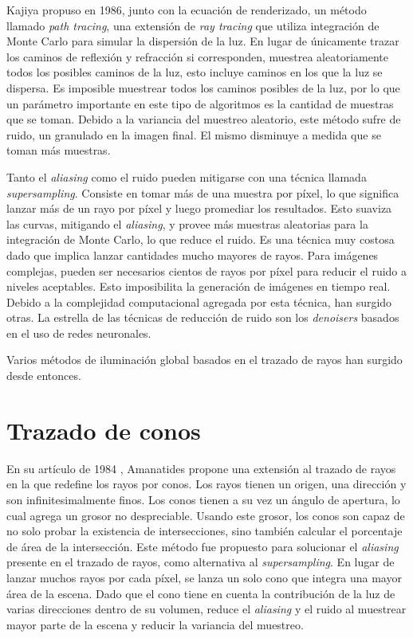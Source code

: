 Kajiya propuso en 1986\cite{rendering-equation}, junto con la ecuación de renderizado, un método llamado \textit{path tracing}, una extensión de \textit{ray tracing} que utiliza integración de Monte Carlo para simular la dispersión de la luz.
En lugar de únicamente trazar los caminos de reflexión y refracción si corresponden, muestrea aleatoriamente todos los posibles caminos de la luz, esto incluye caminos en los que la luz se dispersa.
Es imposible muestrear todos los caminos posibles de la luz, por lo que un parámetro importante en este tipo de algoritmos es la cantidad de muestras que se toman.
Debido a la variancia del muestreo aleatorio, este método sufre de ruido, un granulado en la imagen final.
El mismo disminuye a medida que se toman más muestras.


Tanto el \textit{aliasing} como el ruido pueden mitigarse con una técnica llamada \textit{supersampling}.
Consiste en tomar más de una muestra por píxel, lo que significa lanzar más de un rayo por píxel y luego promediar los resultados.
Esto suaviza las curvas, mitigando el \textit{aliasing}, y provee más muestras aleatorias para la integración de Monte Carlo, lo que reduce el ruido.
Es una técnica muy costosa dado que implica lanzar cantidades mucho mayores de rayos.
Para imágenes complejas, pueden ser necesarios cientos de rayos por píxel para reducir el ruido a niveles aceptables.
Esto imposibilita la generación de imágenes en tiempo real.
Debido a la complejidad computacional agregada por esta técnica, han surgido otras.
La estrella de las técnicas de reducción de ruido son los \textit{denoisers} basados en el uso de redes neuronales.

Varios métodos de iluminación global basados en el trazado de rayos han surgido desde entonces.

\section{Trazado de conos}\label{sec:historical-cone-tracing}

En su artículo de 1984 \cite{ray-tracing-with-cones}, Amanatides propone una extensión al trazado de rayos en la que redefine los rayos por conos.
Los rayos tienen un origen, una dirección y son infinitesimalmente finos.
Los conos tienen a su vez un ángulo de apertura, lo cual agrega un grosor no despreciable.
Usando este grosor, los conos son capaz de no solo probar la existencia de intersecciones, sino también calcular el porcentaje de área de la intersección.
Este método fue propuesto para solucionar el \textit{aliasing} presente en el trazado de rayos, como alternativa al \textit{supersampling}.
En lugar de lanzar muchos rayos por cada píxel, se lanza un solo cono que integra una mayor área de la escena.
Dado que el cono tiene en cuenta la contribución de la luz de varias direcciones dentro de su volumen, reduce el \textit{aliasing} y el ruido al muestrear mayor parte de la escena y reducir la variancia del muestreo.

